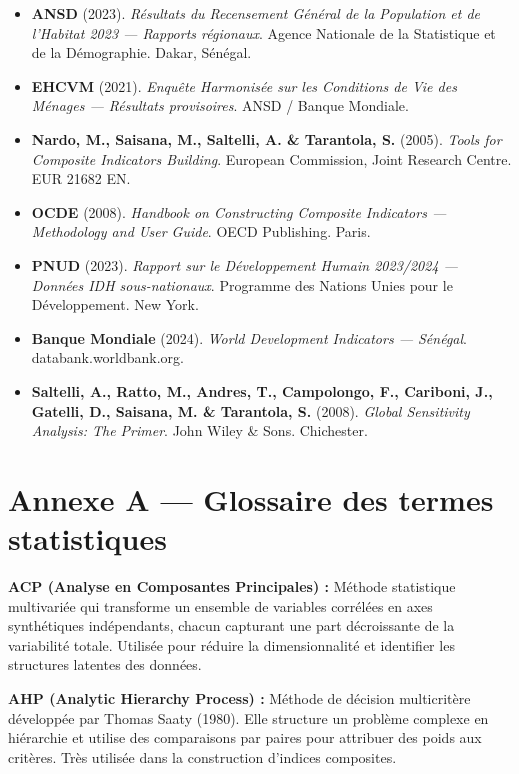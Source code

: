 \documentclass[
]{article}
\begin{document}
\begin{itemize}
\item
  \textbf{ANSD} (2023). \emph{Résultats du Recensement Général de la
  Population et de l'Habitat 2023 --- Rapports régionaux}. Agence
  Nationale de la Statistique et de la Démographie. Dakar, Sénégal.
\item
  \textbf{EHCVM} (2021). \emph{Enquête Harmonisée sur les Conditions de
  Vie des Ménages --- Résultats provisoires}. ANSD / Banque Mondiale.
\item
  \textbf{Nardo, M., Saisana, M., Saltelli, A. \& Tarantola, S.} (2005).
  \emph{Tools for Composite Indicators Building}. European Commission,
  Joint Research Centre. EUR 21682 EN.
\item
  \textbf{OCDE} (2008). \emph{Handbook on Constructing Composite
  Indicators --- Methodology and User Guide}. OECD Publishing. Paris.
\item
  \textbf{PNUD} (2023). \emph{Rapport sur le Développement Humain
  2023/2024 --- Données IDH sous-nationaux}. Programme des Nations Unies
  pour le Développement. New York.
\item
  \textbf{Banque Mondiale} (2024). \emph{World Development Indicators
  --- Sénégal}. databank.worldbank.org.
\item
  \textbf{Saltelli, A., Ratto, M., Andres, T., Campolongo, F., Cariboni,
  J., Gatelli, D., Saisana, M. \& Tarantola, S.} (2008). \emph{Global
  Sensitivity Analysis: The Primer}. John Wiley \& Sons. Chichester.
\end{itemize}

\newpage

\section*{Annexe A --- Glossaire des termes
statistiques}\label{annexe-a-glossaire-des-termes-statistiques}


\textbf{ACP (Analyse en Composantes Principales) :} Méthode statistique
multivariée qui transforme un ensemble de variables corrélées en axes
synthétiques indépendants, chacun capturant une part décroissante de la
variabilité totale. Utilisée pour réduire la dimensionnalité et
identifier les structures latentes des données.

\textbf{AHP (Analytic Hierarchy Process) :} Méthode de décision
multicritère développée par Thomas Saaty (1980). Elle structure un
problème complexe en hiérarchie et utilise des comparaisons par paires
pour attribuer des poids aux critères. Très utilisée dans la
construction d'indices composites.
\end{document}
